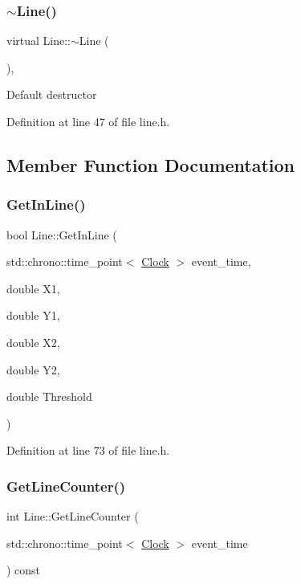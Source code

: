 \subsubsection{\texorpdfstring{$\sim$\+Line()}{~Line()}}
{\footnotesize\ttfamily virtual Line\+::$\sim$\+Line (\begin{DoxyParamCaption}{ }\end{DoxyParamCaption})\hspace{0.3cm}{\ttfamily [inline]}, {\ttfamily [virtual]}}

Default destructor 

Definition at line 47 of file line.\+h.



\subsection{Member Function Documentation}
\mbox{\label{class_line_a4c9d571599ebc5e9b6090b54a338fbde}} 
\subsubsection{\texorpdfstring{Get\+In\+Line()}{GetInLine()}}
{\footnotesize\ttfamily bool Line\+::\+Get\+In\+Line (\begin{DoxyParamCaption}\item[{std\+::chrono\+::time\+\_\+point$<$ \mbox{\hyperlink{universe_8h_a0ef8d951d1ca5ab3cfaf7ab4c7a6fd80}{Clock}} $>$}]{event\+\_\+time,  }\item[{double}]{X1,  }\item[{double}]{Y1,  }\item[{double}]{X2,  }\item[{double}]{Y2,  }\item[{double}]{Threshold }\end{DoxyParamCaption})\hspace{0.3cm}{\ttfamily [inline]}}



Definition at line 73 of file line.\+h.

\mbox{\label{class_line_ac13c6405cfd2a586633b5a5eece05fff}} 
\subsubsection{\texorpdfstring{Get\+Line\+Counter()}{GetLineCounter()}}
{\footnotesize\ttfamily int Line\+::\+Get\+Line\+Counter (\begin{DoxyParamCaption}\item[{std\+::chrono\+::time\+\_\+point$<$ \mbox{\hyperlink{universe_8h_a0ef8d951d1ca5ab3cfaf7ab4c7a6fd80}{Clock}} $>$}]{event\+\_\+time }\end{DoxyParamCaption}) const\hspace{0.3cm}{\ttfamily [inline]}}



